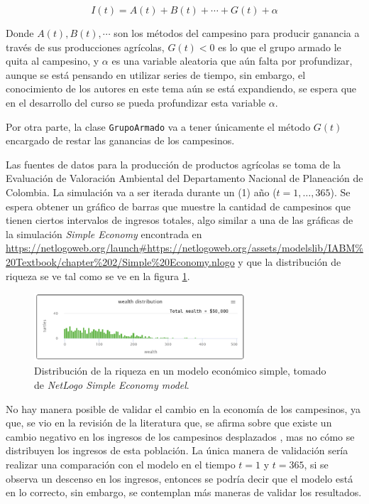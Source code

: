 \documentclass{article}
\begin{document}
\[
I(t) = A(t) + B(t) + \cdots + G(t) + \alpha
\]

Donde $A(t), B(t), \cdots$ son los métodos del campesino para producir ganancia a través de sus producciones agrícolas, $G(t)<0$ es lo que el grupo armado le quita al campesino, y $\alpha$ es una variable aleatoria que aún falta por profundizar, aunque se está pensando en utilizar series de tiempo, sin embargo, el conocimiento de los autores en este tema aún se está expandiendo, se espera que en el desarrollo del curso se pueda profundizar esta variable $\alpha$.

Por otra parte, la clase \texttt{GrupoArmado} va a tener únicamente el método $G(t)$ encargado de restar las ganancias de los campesinos.

Las fuentes de datos para la producción de productos agrícolas se toma de la Evaluación de Valoración Ambiental del Departamento Nacional de Planeación de Colombia\cite{EVA2020}. La simulación va a ser iterada durante un (1) año ($t = 1, \dots, 365$). Se espera obtener un gráfico de barras que muestre la cantidad de campesinos que tienen ciertos intervalos de ingresos totales, algo similar a una de las gráficas de la simulación \textit{Simple Economy} encontrada en \url{https://netlogoweb.org/launch#https://netlogoweb.org/assets/modelslib/IABM%20Textbook/chapter%202/Simple%20Economy.nlogo} y que la distribución de riqueza se ve tal como se ve en la figura \ref{fig:fig2}. 

\begin{figure}[ht]
  \centering
  \includegraphics[width=0.7\textwidth]{img/Fig2.png}
  \caption{\label{fig:fig2} Distribución de la riqueza en un modelo económico simple, tomado de \textit{NetLogo Simple Economy model}\cite{wilensky2011simpleeconomy}.}
\end{figure}


No hay manera posible de validar el cambio en la economía de los campesinos, ya que, se vio en la revisión de la literatura que, se afirma sobre que existe un cambio negativo en los ingresos de los campesinos desplazados \cite{perez2016impacto,santacoloma2015importancia,ruiz2011desplazamiento,solano2020determinantes}, mas no cómo se distribuyen los ingresos de esta población. La única manera de validación sería realizar una comparación con el modelo en el tiempo $t = 1$ y $t = 365$, si se observa un descenso en los ingresos, entonces se podría decir que el modelo está en lo correcto, sin embargo, se contemplan más maneras de validar los resultados.




\end{document}
